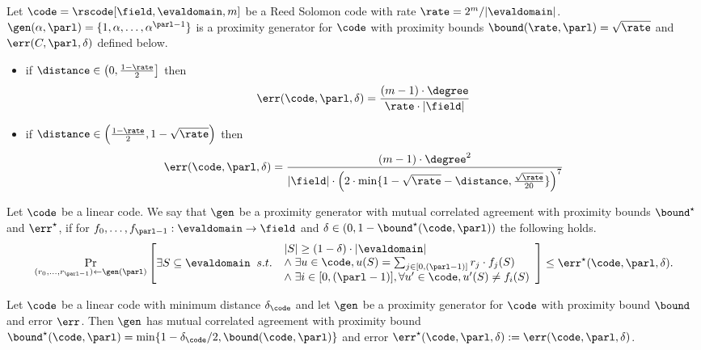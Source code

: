 \begin{theorem}\label{thm:proximity_gap_whir}
    Let $\code = \rscode[\field,\evaldomain,m]$ be a Reed Solomon code with rate $\rate = 2^m/|\evaldomain|$. $\gen(\alpha,\parl)=\{1,\alpha,\ldots,\alpha^{\parl-1}\}$ is a proximity generator for $\code$ with proximity bounds ${\bound}(\rate,\parl)=\sqrt{\rate}$ and $\err(C,\parl,\delta)$ defined below.
    \begin{itemize}
        \item if $\distance \in \left(0,\frac{1-\rate}{2}\right]$ then
            \[
                \err(\code,\parl,\delta)=\frac{(m-1)\cdot \degree}{\rate\cdot|\field|}
            \]
        \item if $\distance \in \Bigl(\frac{1-\rate}{2}, 1-\sqrt{\rate}\Bigr)$ then
        \[
            \err(\code,\parl,\delta)=\frac{(m-1)\cdot {\degree}^2}{|\field|\cdot{\Bigl(2\cdot\min\{1-\sqrt{\rate}-\distance,\frac{\sqrt{\rate}}{20}\}\Bigr)}^7}
        \]
    \end{itemize}
\end{theorem}

\begin{definition}\label{def:gen_mutual_corr_agreement}
    Let $\code$ be a linear code. We say that $\gen$ be a proximity generator with mutual correlated agreement with proximity bounds ${\bound}^\star$ and $\err^\star$, if for $f_0,\ldots,f_{\parl-1}:\evaldomain\rightarrow\field$ and $\delta\in(0,1-{\bound}^\star(\code,\parl))$ the following holds.
    \[
    \Pr_{(r_0, \ldots, r_{\parl-1}) \leftarrow \gen(\parl)} \left[
        \exists S \subseteq \evaldomain \;\; s.t.\;\;
        \begin{array}{l}
        |S| \geq (1 - \delta) \cdot |\evaldomain| \\
        \land\; \exists u \in \code, u(S) = \sum_{j \in [0,(\parl-1)]} r_j \cdot f_j(S) \\
        \land\; \exists i \in [0,(\parl-1)], \forall u' \in \code, u'(S) \neq f_i(S)
        \end{array}\right]
    \leq \err^\star(\code, \parl, \delta).
    \]
\end{definition}

\begin{lemma}\label{lemma:gen_mutual_corr_agreement}
    Let $\code$ be a linear code with minimum distance $\delta_{\code}$ and let $\gen$ be a proximity generator for $\code$ with proximity bound ${\bound}$ and error $\err$. Then $\gen$ has mutual correlated agreement with proximity bound ${\bound}^\star(\code, \parl) = \min\{1 - \delta_{\code}/2, \bound(\code, \parl)\}$ and error $\err^\star(\code, \parl, \delta) := \err(\code, \parl, \delta)$.
\end{lemma}

